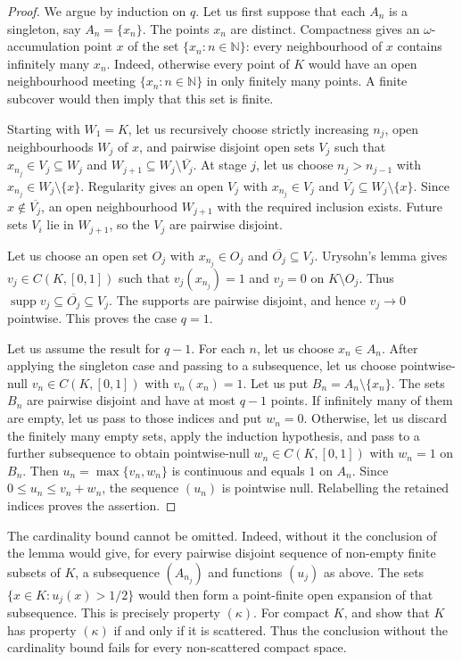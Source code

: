 \documentclass[a4paper]{amsart}
\newcommand{\N}{\mathbb{N}}
\begin{document}
\begin{proof}
We argue by induction on $q$.  Let us first suppose that each $A_n$ is a
singleton, say $A_n=\{x_n\}$.  The points $x_n$ are distinct.  Compactness
gives an $\omega$-accumulation point $x$ of the set $\{x_n:n\in\N\}$:
every neighbourhood of $x$ contains infinitely many $x_n$.
Indeed, otherwise every point of $K$ would have an open neighbourhood
meeting $\{x_n:n\in\N\}$ in only finitely many points.  A finite
subcover would then imply that this set is finite.

Starting with $W_1=K$, let us recursively choose strictly increasing $n_j$,
open neighbourhoods
$W_j$ of $x$, and pairwise disjoint open sets $V_j$ such that
$x_{n_j}\in V_j\subseteq W_j$ and
$W_{j+1}\subseteq W_j\setminus\overline{V_j}$.
At stage $j$, let us choose $n_j>n_{j-1}$ with
$x_{n_j}\in W_j\setminus\{x\}$.  Regularity gives an open $V_j$ with
$x_{n_j}\in V_j$ and
$\overline{V_j}\subseteq W_j\setminus\{x\}$.  Since
$x\notin\overline{V_j}$, an open neighbourhood $W_{j+1}$ with the
required inclusion exists.  Future sets $V_i$ lie in
$W_{j+1}$, so the $V_j$ are pairwise disjoint.

Let us choose an open set $O_j$ with $x_{n_j}\in O_j$ and
$\overline{O_j}\subseteq V_j$.  Urysohn's lemma gives
$v_j\in C(K,[0,1])$ such that $v_j(x_{n_j})=1$ and $v_j=0$ on
$K\setminus O_j$.  Thus
$\operatorname{supp}v_j\subseteq\overline{O_j}\subseteq V_j$.
The supports are pairwise disjoint, and hence $v_j\to0$ pointwise.  This
proves the case $q=1$.

Let us assume the result for $q-1$.
For each $n$, let us choose $x_n\in A_n$.  After applying the singleton
case and passing to a subsequence, let us choose pointwise-null
$v_n\in C(K,[0,1])$ with
$v_n(x_n)=1$.  Let us put $B_n=A_n\setminus\{x_n\}$.  The sets $B_n$ are
pairwise disjoint and have at most $q-1$ points.  If infinitely many of
them are empty, let us pass to those indices and put $w_n=0$.  Otherwise,
let us discard the finitely many empty sets, apply the induction
hypothesis, and pass to a further subsequence to obtain pointwise-null
$w_n\in C(K,[0,1])$ with $w_n=1$ on $B_n$.  Then
$u_n=\max\{v_n,w_n\}$ is continuous and equals $1$ on $A_n$.  Since
$0\leqslant u_n\leqslant v_n+w_n$, the sequence $(u_n)$ is pointwise
null.
Relabelling the retained indices proves the assertion.
\end{proof}

The cardinality bound cannot be omitted.  Indeed, without it the
conclusion of the lemma would give, for every pairwise disjoint sequence
of non-empty finite subsets of $K$, a subsequence $(A_{n_j})$ and
functions $(u_j)$ as above.  The sets
$\{x\in K:u_j(x)>1/2\}$ would then form a point-finite open expansion of
that subsequence.  This is precisely property $(\kappa)$.  For compact
$K$, \cite[Theorem~5.9]{KrupskiMarciszewski2017} and
\cite[Theorem~1.2]{KrupskiKucharskiMarciszewski2025} show that $K$ has
property $(\kappa)$ if and only if it is scattered.  Thus the conclusion
without the cardinality bound fails for every non-scattered compact
space.
\end{document}
